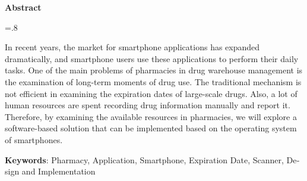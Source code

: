 


\pagestyle{empty}

\begin{latin}

\begin{center}
\textbf{Abstract}
\end{center}
\baselineskip=.8\baselineskip

In recent years, the market for smartphone applications has expanded dramatically, and smartphone users use these applications to perform their daily tasks.
One of the main problems of pharmacies in drug warehouse management is the examination of long-term moments of drug use. The traditional mechanism is not efficient in examining the expiration dates of large-scale drugs. Also, a lot of human resources are spent recording drug information manually and report it. Therefore, by examining the available resources in pharmacies, we will explore a software-based solution that can be implemented based on the operating system of smartphones.

\bigskip\noindent\textbf{Keywords}:
Pharmacy, Application, Smartphone, Expiration Date, Scanner, Design and Implementation

\end{latin}

\newpage
